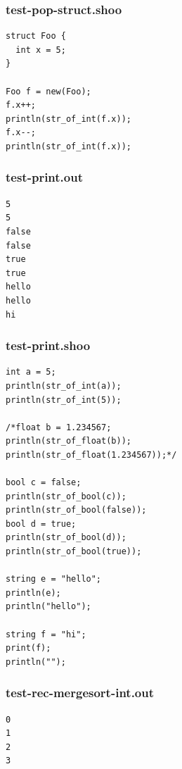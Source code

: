 \documentclass[12pt]{article}
\begin{document}
\subsubsection{test-pop-struct.shoo}
\begin{mdframed}[hidealllines=true,backgroundcolor=blue!10]
\begin{lstlisting}
struct Foo {
  int x = 5;
}

Foo f = new(Foo);
f.x++;
println(str_of_int(f.x));
f.x--;
println(str_of_int(f.x));\end{lstlisting}
\end{mdframed}
\subsubsection{test-print.out}
\begin{mdframed}[hidealllines=true,backgroundcolor=green!10]
\begin{lstlisting}
5
5
false
false
true
true
hello
hello
hi
\end{lstlisting}
\end{mdframed}
\subsubsection{test-print.shoo}
\begin{mdframed}[hidealllines=true,backgroundcolor=blue!10]
\begin{lstlisting}
int a = 5;
println(str_of_int(a));
println(str_of_int(5));

/*float b = 1.234567;
println(str_of_float(b));
println(str_of_float(1.234567));*/

bool c = false;
println(str_of_bool(c));
println(str_of_bool(false));
bool d = true;
println(str_of_bool(d));
println(str_of_bool(true));

string e = "hello";
println(e);
println("hello");

string f = "hi";
print(f);
println("");
\end{lstlisting}
\end{mdframed}
\subsubsection{test-rec-mergesort-int.out}
\begin{mdframed}[hidealllines=true,backgroundcolor=green!10]
\begin{lstlisting}
0
1
2
3
\end{lstlisting}
\end{mdframed}
\end{document}
